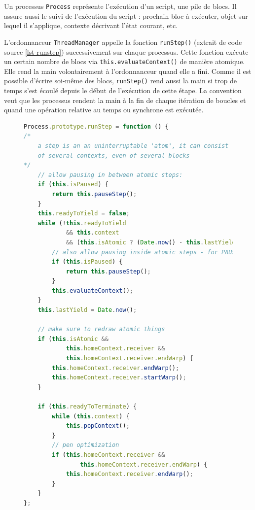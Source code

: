 Un processus \texttt{Process} représente l'exécution d'un script, une pile de blocs. Il assure aussi le suivi de l'exécution du script : prochain bloc à exécuter, objet sur lequel il s'applique, contexte décrivant l'état courant, etc.

L'ordonnanceur \texttt{ThreadManager} appelle la fonction \texttt{runStep()} (extrait de code source \ref{lst-runstep}) successivement sur chaque processus. Cette fonction exécute un certain nombre de blocs via \texttt{this.evaluateContext()} de manière atomique. Elle rend la main volontairement à l'ordonnanceur quand elle a fini. Comme il est possible d'écrire soi-même des blocs, \texttt{runStep()} rend aussi la main si trop de temps s'est écoulé depuis le début de l'exécution de cette étape. La convention veut que les processus rendent la main à la fin de chaque itération de boucles et quand une opération relative au temps ou synchrone est exécutée.
\begin{figure}
\begin{lstlisting}[caption={Fonction \texttt{runStep()} de \texttt{Process}},label=lst-runstep,language=JavaScript]
Process.prototype.runStep = function () {
/*
    a step is an an uninterruptable 'atom', it can consist
    of several contexts, even of several blocks
*/
    // allow pausing in between atomic steps:
    if (this.isPaused) {
        return this.pauseStep();
    }
    this.readyToYield = false;
    while (!this.readyToYield
            && this.context
            && (this.isAtomic ? (Date.now() - this.lastYield < this.timeout) : true) ) {
        // also allow pausing inside atomic steps - for PAUSE block primitive:
        if (this.isPaused) {
            return this.pauseStep();
        }
        this.evaluateContext();
    }
    this.lastYield = Date.now();

    // make sure to redraw atomic things
    if (this.isAtomic &&
            this.homeContext.receiver &&
            this.homeContext.receiver.endWarp) {
        this.homeContext.receiver.endWarp();
        this.homeContext.receiver.startWarp();
    }

    if (this.readyToTerminate) {
        while (this.context) {
            this.popContext();
        }
        // pen optimization
        if (this.homeContext.receiver &&
                this.homeContext.receiver.endWarp) {
            this.homeContext.receiver.endWarp();
        }
    }
};
\end{lstlisting}
\end{figure}


